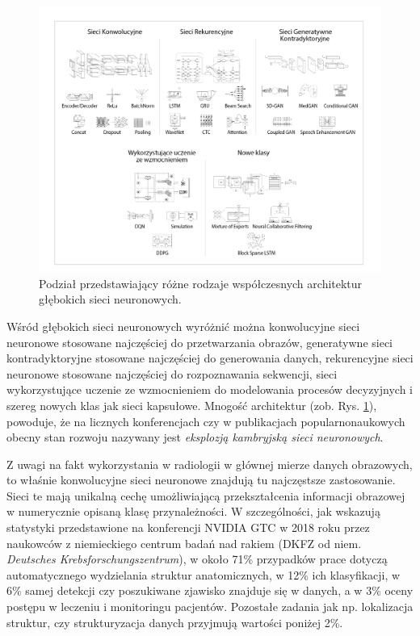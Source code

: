 \begin{figure}[t!]
	\centering
	\includegraphics[width=1.0\textwidth]{figures/rodzajeSieciNeuronowych.png}
	\caption{Podział przedstawiający różne rodzaje współczesnych architektur głębokich sieci neuronowych.}
	\label{DLcambrianExplosion}
\end{figure}

Wśród głębokich sieci neuronowych wyróżnić można konwolucyjne sieci neuronowe stosowane najczęściej do przetwarzania obrazów, generatywne sieci kontradyktoryjne stosowane najczęściej do generowania danych, rekurencyjne sieci neuronowe stosowane najczęściej do rozpoznawania sekwencji, sieci wykorzystujące uczenie ze wzmocnieniem do modelowania procesów decyzyjnych i szereg nowych klas jak sieci kapsułowe. Mnogość architektur (zob. Rys. \ref{DLcambrianExplosion}), powoduje, że na licznych konferencjach czy w publikacjach popularnonaukowych obecny stan rozwoju nazywany jest \textit{eksplozją kambryjską sieci neuronowych}. 


Z uwagi na fakt wykorzystania w radiologii w głównej mierze danych obrazowych, to właśnie konwolucyjne sieci neuronowe znajdują tu najczęstsze zastosowanie. Sieci te mają unikalną cechę umożliwiającą przekształcenia informacji obrazowej w numerycznie opisaną klasę przynależności. W szczególności, jak wskazują statystyki przedstawione na konferencji NVIDIA GTC w 2018 roku przez naukowców z niemieckiego centrum badań nad rakiem (DKFZ od niem. \textit{Deutsches Krebsforschungszentrum}), w około 71\% przypadków prace dotyczą automatycznego wydzielania struktur anatomicznych, w 12\% ich klasyfikacji, w 6\% samej detekcji czy poszukiwane zjawisko znajduje się w danych, a w 3\% oceny postępu w leczeniu i monitoringu pacjentów. Pozostałe zadania jak np. lokalizacja struktur, czy strukturyzacja danych przyjmują wartości poniżej 2\%.

